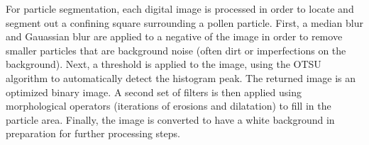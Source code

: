 For particle segmentation, each digital image is processed in order to locate and segment out a confining square surrounding a pollen particle. First, a median blur and Gauassian blur are applied to a negative of the image in order to remove smaller particles that are background noise (often dirt or imperfections on the background). 
Next, a threshold is applied to the image, using the OTSU algorithm to automatically detect the histogram peak. The returned image is an optimized binary image. A second set of filters is then applied using morphological operators (iterations of erosions and dilatation) to fill in the particle area. Finally, the image is converted to have a white background in preparation for further processing steps.
  
  
  
  
  